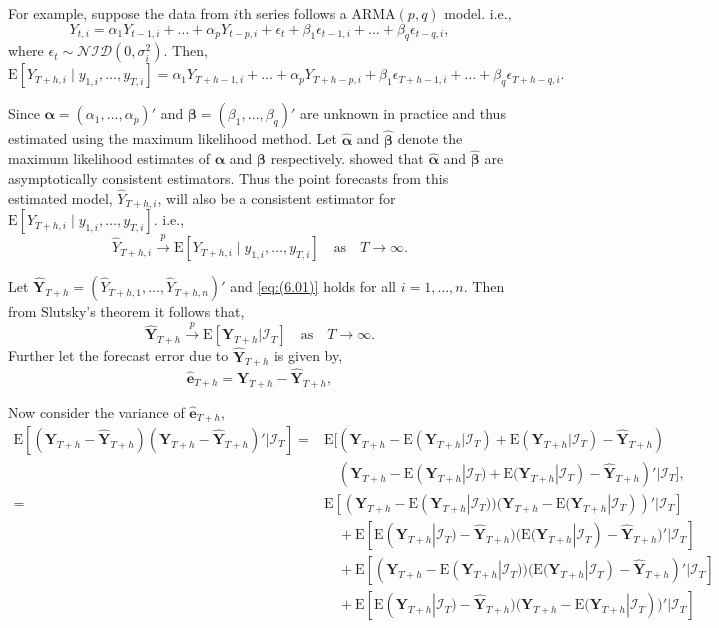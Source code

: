 \documentclass[a4paper, 11pt]{article}
\def\E{\text{E}}
\begin{document}
For example, suppose the data from $i$th series follows a ARMA$(p,q)$ model. i.e.,
$$
Y_{t,i}=\alpha_1Y_{t-1,i}+\dots+\alpha_pY_{t-p,i}+\epsilon_t + \beta_1\epsilon_{t-1,i}+\dots+\beta_q\epsilon_{t-q,i},
$$
where $\epsilon_t \sim \mathcal{NID}(0, \sigma_i^2)$. Then,
$$
\E[Y_{T+h,i}\mid y_{1,i},\dots,y_{T,i}] = \alpha_1Y_{T+h-1,i}+\dots+\alpha_pY_{T+h-p,i}+ \beta_1\epsilon_{T+h-1,i}+\dots+\beta_q\epsilon_{T+h-q,i}.
$$

Since $\bm{\alpha} = (\alpha_1,\dots,\alpha_p)'$ and $\bm{\beta} = (\beta_1,\dots,\beta_q)'$ are unknown in practice and thus estimated using the maximum likelihood method. Let $\bm{\hat{\alpha}}$ and $\bm{\hat{\beta}}$ denote the maximum likelihood estimates of $\bm{\alpha}$ and $\bm{\beta}$ respectively. \citet{Yao2006} showed that $\bm{\hat{\alpha}}$ and $\bm{\hat{\beta}}$ are asymptotically consistent estimators. Thus the point forecasts from this estimated model, $\hat{Y}_{T+h,i}$, will also be a consistent estimator for $\E[Y_{T+h,i}\mid y_{1,i},\dots,y_{T,i}]$. i.e.,
\begin{equation} \label{eq:(6.01)}
\hat{Y}_{T+h,i} \overset{p}{\to} \E[Y_{T+h,i}\mid y_{1,i},\dots,y_{T,i}] \quad \text{as} \quad T \to \infty.
\end{equation}

Let $\hat{\bm{Y}}_{T+h}=(\hat{Y}_{T+h,1},\dots,\hat{Y}_{T+h,n})'$ and \eqref{eq:(6.01)} holds for all $i=1,\dots,n$. Then from Slutsky's theorem it follows that,
\begin{equation}\label{eq:(6.02)}
\hat{\bm{Y}}_{T+h} \overset{p}{\to} \E[\bm{Y}_{T+h}|\bm{\mathcal{I}}_T] \quad \text{as} \quad T \to \infty.
\end{equation}
Further let the forecast error due to $\hat{\bm{Y}}_{T+h}$ is given by,
\begin{equation*}
\hat{\bm{e}}_{T+h} = \bm{Y}_{T+h}-\hat{\bm{Y}}_{T+h},
\end{equation*}

Now consider the variance of $\hat{\bm{e}}_{T+h}$,
\begin{align*}
\E[(\bm{Y}_{T+h} - \hat{\bm{Y}}_{T+h})(\bm{Y}_{T+h} - \hat{\bm{Y}}_{T+h})'|\bm{\mathcal{I}}_T] = &
\E[(\bm{Y}_{T+h} - \E(\bm{Y}_{T+h}|\bm{\mathcal{I}}_T) + \E(\bm{Y}_{T+h}|\bm{\mathcal{I}}_T)- \hat{\bm{Y}}_{T+h})\\
& \quad
(\bm{Y}_{T+h} - \E(\bm{Y}_{T+h}|\bm{\mathcal{I}}_T) + \E(\bm{Y}_{T+h}|\bm{\mathcal{I}}_T) - \hat{\bm{Y}}_{T+h})'|\bm{\mathcal{I}}_T],\\
= &
\E[(\bm{Y}_{T+h} - \E(\bm{Y}_{T+h}|\bm{\mathcal{I}}_T))(\bm{Y}_{T+h} - \E(\bm{Y}_{T+h}|\bm{\mathcal{I}}_T))'|\bm{\mathcal{I}}_T]\\
& \quad
+ \E[\E(\bm{Y}_{T+h}|\bm{\mathcal{I}}_T) - \hat{\bm{Y}}_{T+h})(\E(\bm{Y}_{T+h}|\bm{\mathcal{I}}_T) - \hat{\bm{Y}}_{T+h})'|\bm{\mathcal{I}}_T]\\
& \quad
+  \E[(\bm{Y}_{T+h} - \E(\bm{Y}_{T+h}|\bm{\mathcal{I}}_T))(\E(\bm{Y}_{T+h}|\bm{\mathcal{I}}_T) - \hat{\bm{Y}}_{T+h})'|\bm{\mathcal{I}}_T]\\
&  \quad
+ \E[\E(\bm{Y}_{T+h}|\bm{\mathcal{I}}_T) - \hat{\bm{Y}}_{T+h})(\bm{Y}_{T+h} - \E(\bm{Y}_{T+h}|\bm{\mathcal{I}}_T))'|\bm{\mathcal{I}}_T]
\end{align*}
\end{document}
